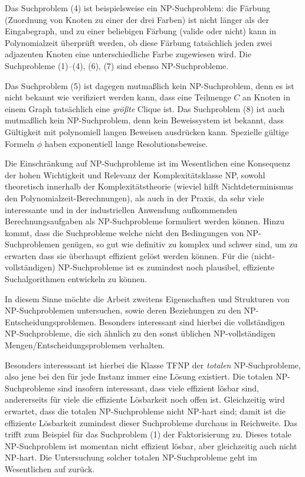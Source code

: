 Das Suchproblem (4) ist beispielsweise ein NP-Suchproblem: die Färbung (Zuordnung von Knoten zu einer der drei Farben) ist nicht länger als der Eingabegraph, und zu einer beliebigen Färbung (valide oder nicht) kann in Polynomialzeit überprüft werden, ob diese Färbung tatsächlich jeden zwei adjazenten Knoten eine unterschiedliche Farbe zugewiesen wird.
Die Suchprobleme (1)--(4), (6), (7) sind ebenso NP-Suchprobleme.

Das Suchproblem (5) ist dagegen mutmaßlich kein NP-Suchproblem, denn es ist nicht bekannt wie verifiziert werden kann, dass eine Teilmenge $C$ an Knoten in einem Graph tatsächlich eine \emph{größte} Clique ist.
Das Suchproblem (8) ist auch mutmaßlich kein NP-Suchproblem, denn kein Beweissystem ist bekannt, dass Gültigkeit mit polynomiell langen Beweisen ausdrücken kann. Spezielle gültige Formeln $\phi$ haben exponentiell lange Resolutionsbeweise.

Die Einschränkung auf NP-Suchprobleme ist im Wesentlichen eine Konsequenz der hohen Wichtigkeit und Relevanz der Komplexitätsklasse NP, sowohl theoretisch innerhalb der Komplexitätstheorie (wieviel hilft Nichtdeterminismus den Polynomialzeit-Berechnungen), als auch in der Praxis, da sehr viele interessante und in der industriellen Anwendung aufkommenden Berechnungsaufgaben als  NP-Suchprobleme formuliert werden können. Hinzu kommt, dass die Suchprobleme welche nicht den Bedingungen von NP-Suchproblemen genügen, so gut wie definitiv zu komplex und schwer sind, um zu erwarten dass sie überhaupt effizient gelöst werden können. Für die (nicht-vollständigen) NP-Suchprobleme ist es zumindest noch plausibel, effiziente Suchalgorithmen entwickeln zu können.

In diesem Sinne möchte die Arbeit zweitens Eigenschaften und Strukturen von NP-Suchproblemen untersuchen, sowie deren Beziehungen zu den NP-Entscheidungsproblemen. Besonders interessant sind hierbei die vollständigen NP-Suchprobleme, die sich ähnlich zu den sonst üblichen NP-vollständigen Mengen/Entscheidungsproblemen verhalten.

Besonders interesssant ist hierbei die Klasse TFNP der \emph{totalen} NP-Suchprobleme, also jene bei den für jede Instanz immer eine Lösung existiert. Die totalen NP-Suchprobleme sind insofern interessant, dass viele effizient lösbar sind, andererseits für viele die effiziente Lösbarkeit noch offen ist. Gleichzeitig wird erwartet, dass die totalen NP-Suchprobleme nicht NP-hart sind; damit ist die effiziente Lösbarkeit zumindest dieser Suchprobleme durchaus in Reichweite. 
Das trifft zum Beispiel für das Suchproblem (1) der Faktorisierung zu. Dieses totale NP-Suchproblem ist momentan nicht effizient lösbar, aber gleichzeitig auch nicht NP-hart. Die Untersuchung solcher totalen NP-Suchprobleme geht im Wesentlichen auf \textcites{megiddo_total_1991}{johnson_how_1988} zurück.


